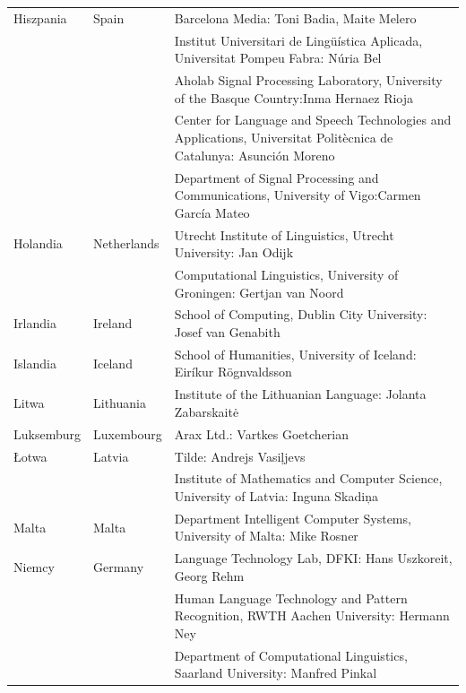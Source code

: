 \begin{longtable}{llp{115mm}}
\addlinespace Hiszpania & \textcolor{grey1}{Spain} & Barcelona Media:
Toni Badia, Maite Melero\\
\addlinespace & & Institut Universitari de Lingüística Aplicada,
Universitat Pompeu Fabra: Núria Bel\\
\addlinespace & & Aholab Signal Processing Laboratory, University of
the Basque Country:\newline Inma Hernaez Rioja\\
\addlinespace & & Center for Language and Speech Technologies and
Applications, Universitat Politècnica de Catalunya: Asunción Moreno
\\
\addlinespace & & Department of Signal Processing and Communications,
University of Vigo:\newline Carmen García Mateo\\
\addlinespace Holandia & \textcolor{grey1}{Netherlands} & Utrecht
Institute of Linguistics, Utrecht University: Jan Odijk\\
\addlinespace & & Computational Linguistics, University of Groningen:
Gertjan van Noord\\
\addlinespace Irlandia & \textcolor{grey1}{Ireland} & School of
Computing, Dublin City University: Josef van Genabith\\
\addlinespace Islandia & \textcolor{grey1}{Iceland} & School of
Humanities, University of Iceland: Eiríkur Rögnvaldsson\\
\addlinespace Litwa & \textcolor{grey1}{Lithuania} & Institute of the
Lithuanian Language: Jolanta Zabarskaitė\\
\addlinespace Luksemburg & \textcolor{grey1}{Luxembourg} & Arax Ltd.:
Vartkes Goetcherian\\
\addlinespace Łotwa & \textcolor{grey1}{Latvia} & Tilde: Andrejs
Vasiļjevs\\
\addlinespace & & Institute of Mathematics and Computer Science,
University of Latvia: Inguna Skadiņa\\
\addlinespace Malta & \textcolor{grey1}{Malta} & Department
Intelligent Computer Systems, University of Malta: Mike Rosner\\
\addlinespace Niemcy & \textcolor{grey1}{Germany} & Language
Technology Lab, DFKI: Hans Uszkoreit, Georg Rehm\\
\addlinespace & & Human Language Technology and Pattern Recognition,
RWTH Aachen University: Hermann Ney\\
\addlinespace & & Department of Computational Linguistics, Saarland
University: Manfred Pinkal\\

\end{longtable}
